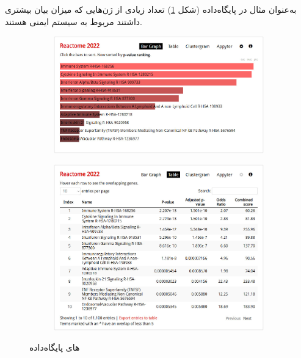 \documentclass{article}
\begin{document}
به‌عنوان مثال در پایگاه‌داده  (شکل \ref{fig:enrichr-pathways-reactome}) تعداد زیادی از ژن‌هایی که میزان بیان بیشتری داشتند مربوط به  سیستم ایمنی  هستند.
\begin{figure}[h!]
	\begin{subfigure}{.59\columnwidth}
		\centering
		\includegraphics[width=\columnwidth]{figs/enrichr-pathways-reactome.jpg}
	\end{subfigure}
	\begin{subfigure}{.41\columnwidth}
		\centering
		\includegraphics[width=\columnwidth]{figs/enrichr-pathways-reactome-tab.jpg}
	\end{subfigure}
	\caption{های پایگاه‌داده }
	\label{fig:enrichr-pathways-reactome}
\end{figure}
\end{document}
